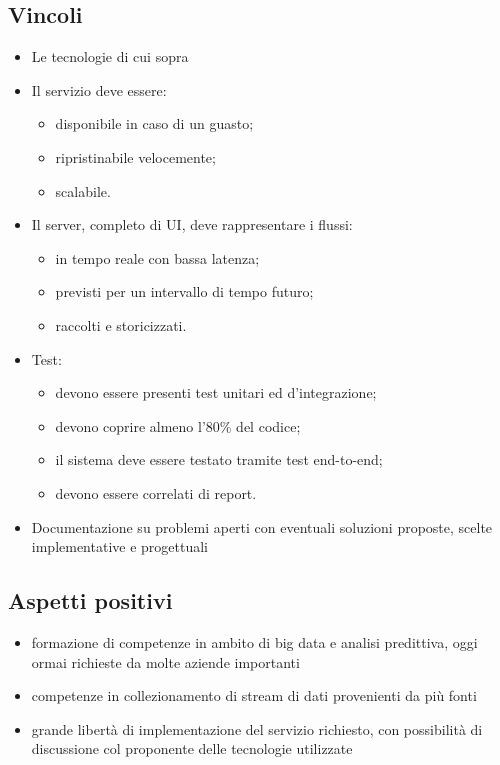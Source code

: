 \subsection{Vincoli}
\begin{itemize}
    \item Le tecnologie di cui sopra
    \item Il servizio deve essere:
    \begin{itemize}
        \item disponibile in caso di un guasto;
        \item ripristinabile velocemente;
        \item scalabile.
    \end{itemize}
    \item Il server, completo di UI, deve rappresentare i flussi:
    \begin{itemize}
        \item in tempo reale con bassa latenza;
        \item previsti per un intervallo di tempo futuro;
        \item raccolti e storicizzati.
    \end{itemize}
    \item Test:
    \begin{itemize}
        \item devono essere presenti test unitari ed d'integrazione;
        \item devono coprire almeno l'80\% del codice;
        \item il sistema deve essere testato tramite test end-to-end;
        \item devono essere correlati di report.
    \end{itemize}
    \item Documentazione su problemi aperti con eventuali soluzioni proposte, scelte implementative e progettuali
\end{itemize}
\subsection{Aspetti positivi}
\begin{itemize}
    \item formazione di competenze in ambito di big data e analisi predittiva, oggi ormai richieste da molte aziende importanti
    \item competenze in collezionamento di stream di dati provenienti da più fonti
    \item grande libertà di implementazione del servizio richiesto, con possibilità di discussione col proponente delle tecnologie utilizzate
\end{itemize}
